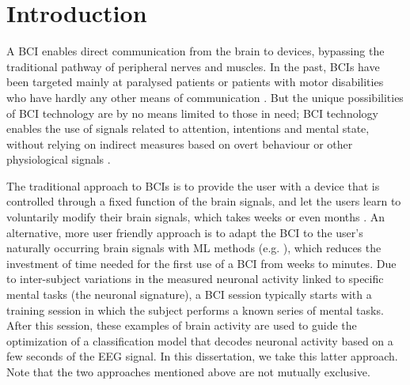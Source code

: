 \chapter{Introduction} \label{chap:intro}

\begin{sloppypar}
\lettrine{A}{} \ac{BCI} enables direct communication from the brain to devices,
bypassing the traditional pathway of peripheral nerves and muscles. In the
past, \acp{BCI} have been targeted mainly at paralysed patients or patients
with motor disabilities who have hardly any other means of communication
\cite{farwell1988tth, birbaumer1999sdp, wolpaw2002bci}. But the unique
possibilities of \ac{BCI} technology are by no means limited to those in need;
\ac{BCI} technology enables the use of signals related to attention, intentions
and mental state, without relying on indirect measures based on overt behaviour
or other physiological signals \cite{zander2011tpb, vangerven2009amp, krauledat2004isa}.
\end{sloppypar}

The traditional approach to \acp{BCI} is to provide the user with a device that
is controlled through a fixed function of the brain signals, and let the users
learn to voluntarily modify their brain signals, which takes weeks or even
months \cite{wolpaw2002bci}. An alternative, more user friendly approach is to
adapt the \ac{BCI} to the user's naturally occurring brain signals with
\acf{ML} methods (e.g. \cite{vidal1977rtd, blankertz2008osf}), which reduces
the investment of time needed for the first use of a \ac{BCI} from weeks to
minutes. Due to inter-subject variations in the measured neuronal activity
linked to specific mental tasks (the neuronal signature), a \ac{BCI} session
typically starts with a training session in which the subject performs a
known series of mental tasks. After this session, these examples of brain
activity are used to guide the optimization of a classification model that
decodes neuronal activity based on a few seconds of the \ac{EEG} signal. In this
dissertation, we take this latter approach. Note that the two approaches
mentioned above are not mutually exclusive.

